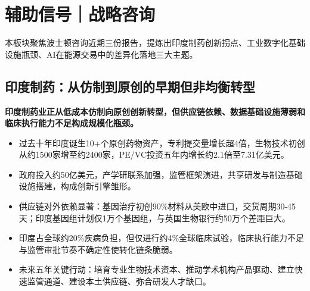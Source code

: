 \documentclass[11pt]{ctexart}
\begin{document}
\section{辅助信号｜战略咨询}
本板块聚焦波士顿咨询近期三份报告，提炼出印度制药创新拐点、工业数字化基础设施瓶颈、AI在能源交易中的差异化落地三大主题。
\subsection{印度制药：从仿制到原创的早期但非均衡转型}
\textbf{印度制药业正从低成本仿制向原创创新转型，但供应链依赖、数据基础设施薄弱和临床执行能力不足构成规模化瓶颈。}
\begin{itemize}
  \item 过去十年印度诞生10+个原创药物资产，专利提交量增长超4倍，生物技术初创从约1500家增至约2400家，PE/VC投资五年内增长约2.1倍至7.31亿美元。
  \item 政府投入约50亿美元，产学研联系加强，监管框架演进，共享研发与制造基础设施搭建，构成创新引擎雏形。
  \item 供应链对外依赖显著：基因治疗初创90\%材料从美欧中进口，交货周期30-45天；印度基因组计划仅1万个基因组，与英国生物银行约50万个差距巨大。
  \item 印度占全球约20\%疾病负担，但仅进行约4\%全球临床试验，临床执行能力不足与监管审批节奏不确定性使转化链条脆弱。
  \item 未来五年关键行动：培育专业生物技术资本、推动学术机构产品驱动、建立快速监管通道、建设本土供应链、弥合研发人才缺口。
\end{itemize}
\end{document}
